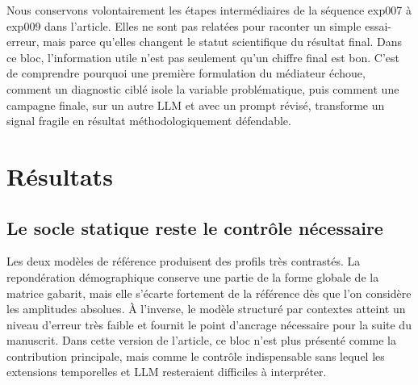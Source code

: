\documentclass[ROIA,Unicode]{cedram}
\begin{document}
Nous conservons volontairement les étapes intermédiaires de la séquence exp007 à exp009 dans l'article. Elles ne sont pas relatées pour raconter un simple essai-erreur, mais parce qu'elles changent le statut scientifique du résultat final. Dans ce bloc, l'information utile n'est pas seulement qu'un chiffre final est bon. C'est de comprendre pourquoi une première formulation du médiateur échoue, comment un diagnostic ciblé isole la variable problématique, puis comment une campagne finale, sur un autre LLM et avec un prompt révisé, transforme un signal fragile en résultat méthodologiquement défendable.

\section{Résultats}
\subsection{Le socle statique reste le contrôle nécessaire}
Les deux modèles de référence produisent des profils très contrastés. La repondération démographique conserve une partie de la forme globale de la matrice gabarit, mais elle s'écarte fortement de la référence dès que l'on considère les amplitudes absolues. À l'inverse, le modèle structuré par contextes atteint un niveau d'erreur très faible et fournit le point d'ancrage nécessaire pour la suite du manuscrit. Dans cette version de l'article, ce bloc n'est plus présenté comme la contribution principale, mais comme le contrôle indispensable sans lequel les extensions temporelles et LLM resteraient difficiles à interpréter.

\begin{table}[ht]
    \centering
    \small
    \caption{Comparaison quantitative des modèles de référence statiques. Les colonnes MAE et distance de Frobenius sont exprimées en intensité moyenne de contact par cellule ; la part diagonale et l'écart de réciprocité sont des quantités sans unité.}
\end{table}
\end{document}
